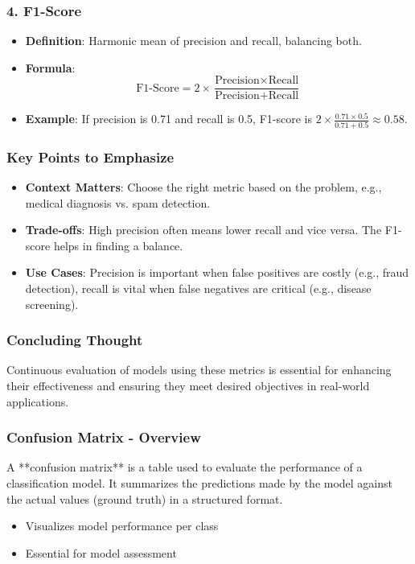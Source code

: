\documentclass[aspectratio=169]{beamer}
\begin{document}
\begin{frame}[fragile]
    \frametitle{4. F1-Score}
    \begin{itemize}
        \item \textbf{Definition}: Harmonic mean of precision and recall, balancing both.
        \item \textbf{Formula}:
            \begin{equation}
            \text{F1-Score} = 2 \times \frac{\text{Precision} \times \text{Recall}}{\text{Precision} + \text{Recall}}
            \end{equation}
        \item \textbf{Example}: 
            If precision is 0.71 and recall is 0.5, F1-score is 
            \( 2 \times \frac{0.71 \times 0.5}{0.71 + 0.5} \approx 0.58 \).
    \end{itemize}
\end{frame}

\begin{frame}[fragile]
    \frametitle{Key Points to Emphasize}
    \begin{itemize}
        \item \textbf{Context Matters}: Choose the right metric based on the problem, e.g., medical diagnosis vs. spam detection.
        \item \textbf{Trade-offs}: High precision often means lower recall and vice versa. The F1-score helps in finding a balance.
        \item \textbf{Use Cases}: Precision is important when false positives are costly (e.g., fraud detection), recall is vital when false negatives are critical (e.g., disease screening).
    \end{itemize}
\end{frame}

\begin{frame}[fragile]
    \frametitle{Concluding Thought}
    Continuous evaluation of models using these metrics is essential for enhancing their effectiveness and ensuring they meet desired objectives in real-world applications.
\end{frame}

\begin{frame}[fragile]
    \frametitle{Confusion Matrix - Overview}
    
    A **confusion matrix** is a table used to evaluate the performance of a classification model. It summarizes the predictions made by the model against the actual values (ground truth) in a structured format. 
    \begin{itemize}
        \item Visualizes model performance per class
        \item Essential for model assessment
    \end{itemize}
\end{frame}
\end{document}
